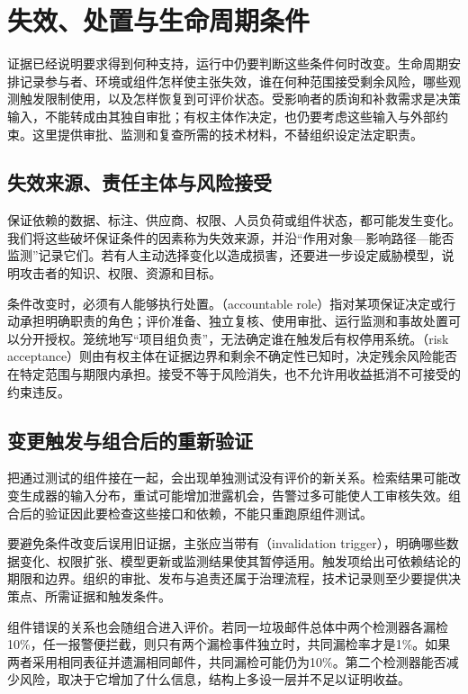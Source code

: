 \section{失效、处置与生命周期条件}
\label{sec:trust-lifecycle}

证据已经说明要求得到何种支持，运行中仍要判断这些条件何时改变。生命周期安排记录参与者、环境或组件怎样使主张失效，谁在何种范围接受剩余风险，哪些观测触发限制使用，以及怎样恢复到可评价状态。受影响者的质询和补救需求是决策输入，不能转成由其独自审批；有权主体作决定，也仍要考虑这些输入与外部约束。这里提供审批、监测和复查所需的技术材料，不替组织设定法定职责。

\subsection{失效来源、责任主体与风险接受}

保证依赖的数据、标注、供应商、权限、人员负荷或组件状态，都可能发生变化。我们将这些破坏保证条件的因素称为失效来源，并沿“作用对象—影响路径—能否监测”记录它们。若有人主动选择变化以造成损害，还要进一步设定威胁模型，说明攻击者的知识、权限、资源和目标。

条件改变时，必须有人能够执行处置。（accountable role）指对某项保证决定或行动承担明确职责的角色；评价准备、独立复核、使用审批、运行监测和事故处置可以分开授权。笼统地写“项目组负责”，无法确定谁在触发后有权停用系统。（risk acceptance）则由有权主体在证据边界和剩余不确定性已知时，决定残余风险能否在特定范围与期限内承担。接受不等于风险消失，也不允许用收益抵消不可接受的约束违反。

\subsection{变更触发与组合后的重新验证}

把通过测试的组件接在一起，会出现单独测试没有评价的新关系。检索结果可能改变生成器的输入分布，重试可能增加泄露机会，告警过多可能使人工审核失效。组合后的验证因此要检查这些接口和依赖，不能只重跑原组件测试。

要避免条件改变后误用旧证据，主张应当带有（invalidation trigger），明确哪些数据变化、权限扩张、模型更新或监测结果使其暂停适用。触发项给出可依赖结论的期限和边界。组织的审批、发布与追责还属于治理流程，技术记录则至少要提供决策点、所需证据和触发条件。

组件错误的关系也会随组合进入评价。若同一垃圾邮件总体中两个检测器各漏检10\%，任一报警便拦截，则只有两个漏检事件独立时，共同漏检率才是1\%。如果两者采用相同表征并遗漏相同邮件，共同漏检可能仍为10\%。第二个检测器能否减少风险，取决于它增加了什么信息，结构上多设一层并不足以证明收益。

